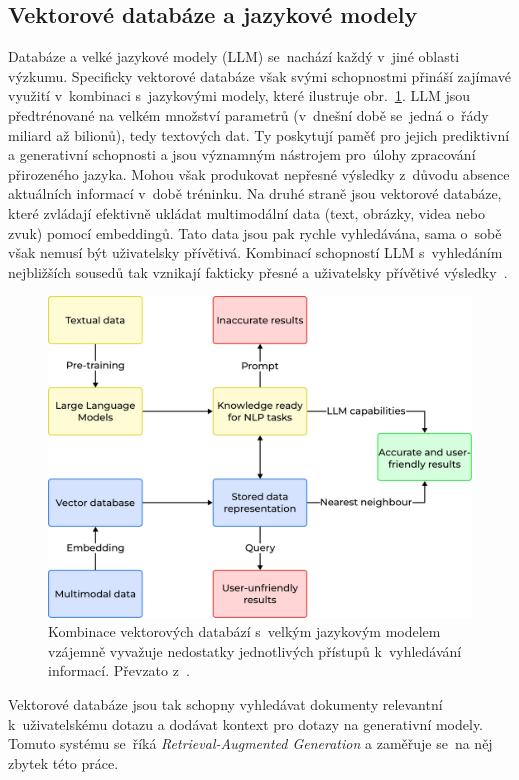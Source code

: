 \subsection{Vektorové databáze a jazykové modely}
Databáze a velké jazykové modely (LLM) se~nachází každý v~jiné oblasti výzkumu. Specificky vektorové databáze však svými schopnostmi přináší zajímavé využití v~kombinaci s~jazykovými modely, které ilustruje obr.~\ref{fig:vdbandllm}. LLM jsou předtrénované na velkém množství parametrů (v~dnešní době se~jedná o~řády miliard až bilionů), tedy textových dat. Ty poskytují paměť pro jejich prediktivní a generativní schopnosti a jsou významným nástrojem pro~úlohy zpracování přirozeného jazyka. Mohou však produkovat nepřesné výsledky z~důvodu absence aktuálních informací v~době tréninku. Na druhé straně jsou vektorové databáze, které zvládají efektivně ukládat multimodální data (text, obrázky, videa nebo zvuk) pomocí embeddingů. Tato data jsou pak rychle vyhledávána, sama o~sobě však nemusí být uživatelsky přívětivá. Kombinací schopností LLM s~vyhledáním nejbližších sousedů tak vznikají fakticky přesné a uživatelsky přívětivé výsledky~\cite{pan2024_vector_dbms}.

\begin{figure}[H]
    \centering
    \includegraphics[width=0.9\linewidth]{obrazky/vdbandllm.pdf}
    \caption{Kombinace vektorových databází s~velkým jazykovým modelem vzájemně vyvažuje nedostatky jednotlivých přístupů k~vyhledávání informací. Převzato z~\cite{han2023_vector_database}.}
    \label{fig:vdbandllm}
\end{figure}

Vektorové databáze jsou tak schopny vyhledávat dokumenty relevantní k~uživatelskému dotazu a dodávat kontext pro dotazy na generativní modely. Tomuto systému se~říká \textit{Retrieval-Augmented Generation} a zaměřuje se~na něj zbytek této práce.

